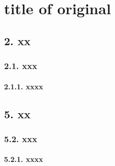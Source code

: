
\chapter*{title of original}
\section*{2. xx}
\subsection*{2.1. xxx}
\subsubsection*{2.1.1. xxxx}
\section*{5. xx}
\subsection*{5.2. xxx}
\subsubsection*{5.2.1. xxxx}
